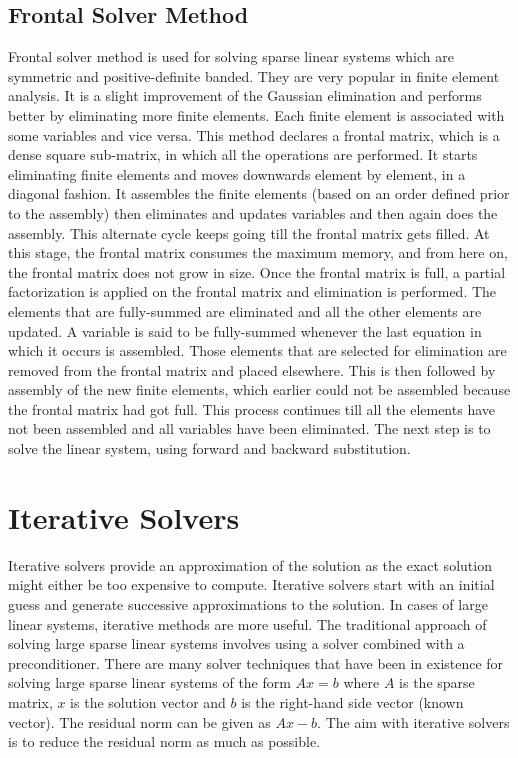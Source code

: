 \subsection{Frontal Solver Method}
Frontal solver method is used for solving sparse linear systems which are symmetric and positive-definite banded. They are very popular in finite element analysis. It is a slight improvement of the Gaussian elimination and performs better by eliminating more finite elements. Each finite element is associated with some variables and vice versa. This method declares a frontal matrix, which is a dense square sub-matrix, in which all the operations are performed. It starts eliminating finite elements and moves downwards element by element, in a diagonal fashion. It assembles the finite elements (based on an order defined prior to the assembly) then eliminates and updates variables and then again does the assembly. This alternate cycle keeps going till the frontal matrix gets filled. At this stage, the frontal matrix consumes the maximum memory, and from here on, the frontal matrix does not grow in size. Once the frontal matrix is full, a partial factorization is applied on the frontal matrix and elimination is performed. The elements that are fully-summed are eliminated and all the other elements are updated. A variable is said to be fully-summed whenever the last equation in which it occurs is assembled. Those elements that are selected for elimination are removed from the frontal matrix and placed elsewhere. This is then followed by assembly of the new finite elements, which earlier could not be assembled because the frontal matrix had got full. This process continues till all the elements have not been assembled and all variables have been eliminated. The next step is to solve the linear system, using forward and backward substitution.

\section{Iterative Solvers}\label{IterativeSolvers}
Iterative solvers provide an approximation of the solution as the exact solution might either be too expensive to compute. Iterative solvers start with an initial guess and generate successive approximations to the solution. In cases of large linear systems, iterative methods are more useful. The traditional approach of solving large sparse linear systems involves using a solver combined with a preconditioner. There are many solver techniques that have been in existence for solving large sparse linear systems of the form $Ax = b$ where $A$ is the sparse matrix, $x$ is the solution vector and $b$ is the right-hand side vector (known vector). The residual norm can be given as $Ax - b$. The aim with iterative solvers is to reduce the residual norm as much as possible. 

